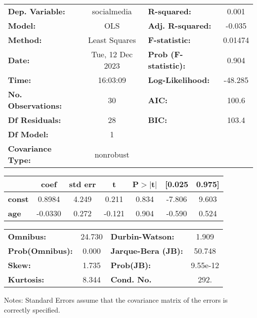 \begin{center}
\begin{tabular}{lclc}
\toprule
\textbf{Dep. Variable:}    &   socialmedia    & \textbf{  R-squared:         } &     0.001   \\
\textbf{Model:}            &       OLS        & \textbf{  Adj. R-squared:    } &    -0.035   \\
\textbf{Method:}           &  Least Squares   & \textbf{  F-statistic:       } &   0.01474   \\
\textbf{Date:}             & Tue, 12 Dec 2023 & \textbf{  Prob (F-statistic):} &    0.904    \\
\textbf{Time:}             &     16:03:09     & \textbf{  Log-Likelihood:    } &   -48.285   \\
\textbf{No. Observations:} &          30      & \textbf{  AIC:               } &     100.6   \\
\textbf{Df Residuals:}     &          28      & \textbf{  BIC:               } &     103.4   \\
\textbf{Df Model:}         &           1      & \textbf{                     } &             \\
\textbf{Covariance Type:}  &    nonrobust     & \textbf{                     } &             \\
\bottomrule
\end{tabular}
\begin{tabular}{lcccccc}
               & \textbf{coef} & \textbf{std err} & \textbf{t} & \textbf{P$> |$t$|$} & \textbf{[0.025} & \textbf{0.975]}  \\
\midrule
\textbf{const} &       0.8984  &        4.249     &     0.211  &         0.834        &       -7.806    &        9.603     \\
\textbf{age}   &      -0.0330  &        0.272     &    -0.121  &         0.904        &       -0.590    &        0.524     \\
\bottomrule
\end{tabular}
\begin{tabular}{lclc}
\textbf{Omnibus:}       & 24.730 & \textbf{  Durbin-Watson:     } &    1.909  \\
\textbf{Prob(Omnibus):} &  0.000 & \textbf{  Jarque-Bera (JB):  } &   50.748  \\
\textbf{Skew:}          &  1.735 & \textbf{  Prob(JB):          } & 9.55e-12  \\
\textbf{Kurtosis:}      &  8.344 & \textbf{  Cond. No.          } &     292.  \\
\bottomrule
\end{tabular}
\end{center}

Notes: \newline
 [1] Standard Errors assume that the covariance matrix of the errors is correctly specified.